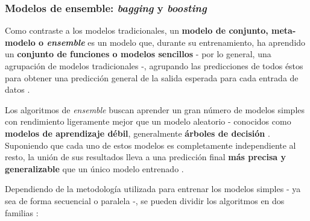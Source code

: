 \subsubsection{Modelos de ensemble: \textit{bagging} y \textit{boosting}}

Como contraste a los modelos tradicionales, un \textbf{modelo de conjunto, meta-modelo o \textit{ensemble}} es un modelo que, durante su entrenamiento, ha aprendido un \textbf{conjunto de funciones o modelos sencillos} - por lo general, una agrupación de modelos tradicionales -, agrupando las predicciones de todos éstos para obtener una predicción general de la salida esperada para cada entrada de datos \cite{aima}.

Los algoritmos de \textit{ensemble} buscan aprender un gran número de modelos simples con rendimiento ligeramente mejor que un modelo aleatorio - conocidos como \textbf{modelos de aprendizaje débil}, generalmente \textbf{árboles de decisión} \cite{Burkov2019TheHM}. Suponiendo que cada uno de estos modelos es completamente independiente al resto, la unión de sus resultados lleva a una predicción final \textbf{más precisa y generalizable} que un único modelo entrenado \cite{Burkov2019TheHM}.

Dependiendo de la metodología utilizada para entrenar los modelos simples - ya sea de forma secuencial o paralela -, se pueden dividir los algoritmos en dos familias \cite{aima}:


